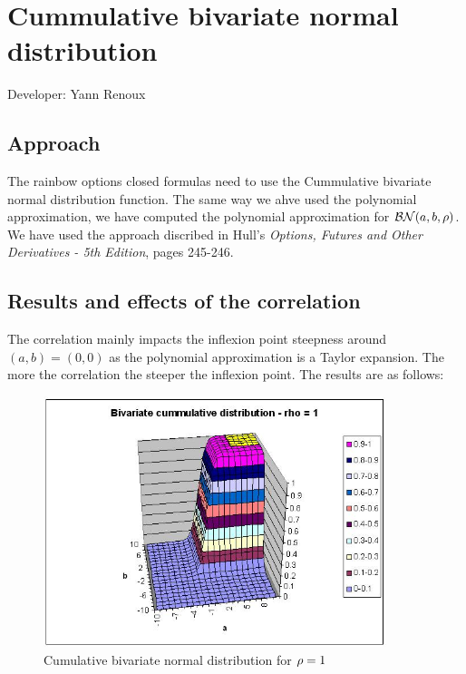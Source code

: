 \section{Cummulative bivariate normal distribution}

Developer: Yann Renoux

\subsection{Approach}

The rainbow options closed formulas need to use the Cummulative bivariate normal distribution function. The same way we ahve used the polynomial approximation, we have computed the polynomial approximation for $\mathcal{BN}(a,b,\rho)$. We have used the approach discribed in Hull's \textit{Options, Futures and Other Derivatives - 5th Edition}, pages 245-246.

\subsection{Results and effects of the correlation}

The correlation mainly impacts the inflexion point steepness around $(a,b)=(0,0)$ as the polynomial approximation is a Taylor expansion. The more the correlation the steeper the inflexion point. The results are as follows:

\begin{figure}
\begin{center}    
        \includegraphics[width=10cm]{Bivn1.jpg}
        \caption{Cumulative bivariate normal distribution for $\rho=1$}
\end{center}
\end{figure}

